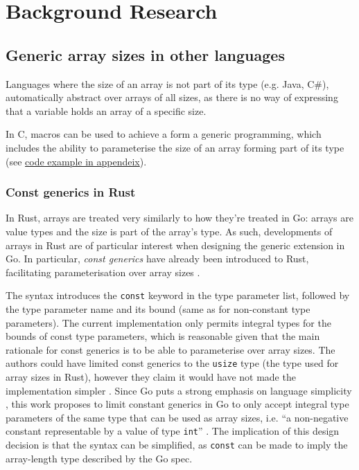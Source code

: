 \section{Background Research}

\subsection{Generic array sizes in other languages}

Languages where the size of an array is not part of its type (e.g. Java, C\#),
automatically abstract over arrays of all sizes, as there is no way of
expressing that a variable holds an array of a specific size.

In C, macros can be used to achieve a form a generic programming, which includes
the ability to parameterise the size of an array forming part of its type (see
\hyperref[sec:generic-c]{code example in appendeix}).

\subsubsection{Const generics in Rust}

In Rust, arrays are treated very similarly to how they're treated in Go: arrays
are value types and the size is part of the array's type. As such, developments
of arrays in Rust are of particular interest when designing the generic
extension in Go. In particular, \emph{const generics} have already been
introduced to Rust, facilitating parameterisation over array sizes
\autocite{rustConstBlog}.

The syntax introduces the \texttt{const} keyword in the type parameter list,
followed by the type parameter name and its bound (same as for non-constant type
parameters). The current implementation only permits integral types for the
bounds of const type parameters, which is reasonable given that the main
rationale for const generics is to be able to parameterise over array sizes. The
authors could have limited const generics to the \texttt{usize} type (the type
used for array sizes in Rust), however they claim it would have not made the
implementation simpler \autocite{rustConstRFC}. Since Go puts a strong emphasis on language simplicity
\autocite{goSimplicity}, this work proposes to limit constant generics in Go to
only accept integral type parameters of the same type that can be used as array
sizes, i.e. ``a non-negative constant representable by a value of type
\texttt{int}'' \autocite{spec}. The implication of this design decision is that
the syntax can be simplified, as \texttt{const} can be made to imply the
array-length type described by the Go spec.

